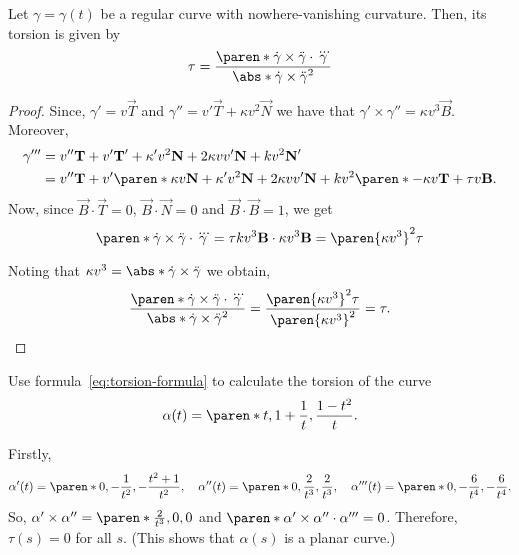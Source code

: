 \documentclass[11pt]{penrose}
\newcommand{\vT}{\vec{T}}
\newcommand{\vN}{\vec{N}}
\newcommand{\vB}{\vec{B}}
\begin{document}
\begin{nthm}
    Let $\gamma = \gamma(t)$ be a regular curve with nowhere-vanishing curvature. Then, its torsion is given by
    \begin{equation}
        \tau
        = \frac{\paren*{\dot{\gamma} \times \ddot{\gamma}} \cdot \dddot{\gamma}}{\abs*{\dot{\gamma} \times \ddot{\gamma}}^2}
        \label{eq:torsion-formula}
    \end{equation}
\end{nthm}
\begin{proof}
    Since, $\gamma' = v \vT$ and $\gamma'' = v' \vT + \kappa v^2 \vN$ we have that $\gamma' \times \gamma'' = \kappa v^3 \vB$. Moreover,
    \begin{align}
        \gamma'''
        &= v'' \vT + v' \vT' + \kappa' v^2 \vN + 2 \kappa v v' \vN + k v^2 \vN'\\
        &= v'' \vT + v' \paren*{\kappa v \vN} + \kappa' v^2 \vN + 2 \kappa v v' \vN + k v^2 \paren*{-\kappa v \vT + \tau v \vB}.
    \end{align}
    Now, since $\vB \cdot \vT = 0$, $\vB \cdot \vN = 0$ and $\vB \cdot \vB = 1$, we get
    \begin{equation}
        \paren*{\dot{\gamma} \times \ddot{\gamma}} \cdot \dddot{\gamma}
        = \tau k v^3 \vB \cdot \kappa v^3 \vB
        = \paren{\kappa v^3}^2 \tau
    \end{equation}

    Noting that $\kappa v^3 = \abs*{\dot{\gamma} \times \ddot{\gamma}}$ we obtain,
    \begin{equation}
        \frac{\paren*{\dot{\gamma} \times \ddot{\gamma}} \cdot \dddot{\gamma}}{\abs*{\dot{\gamma} \times \ddot{\gamma}}^2}
        = \frac{\paren{\kappa v^3}^2 \tau}{\paren{\kappa v^3}^2}
        = \tau.\qedhere
    \end{equation}
\end{proof}

\begin{negg}
    Use formula~\eqref{eq:torsion-formula} to calculate the torsion of the curve
    \begin{equation}
        \alpha(t)
        = \paren*{ t, 1 + \frac{1}{t}, \frac{1 - t^2}{t} }.
    \end{equation}

    Firstly,
    \begin{equation}
        \alpha'(t) = \paren*{0, -\frac{1}{t^2}, -\frac{t^2 + 1}{t^2}}, \quad
        \alpha''(t) = \paren*{0, \frac{2}{t^3}, \frac{2}{t^3}}, \quad
        \alpha'''(t) = \paren*{0, -\frac{6}{t^4}, -\frac{6}{t^4}}.
    \end{equation}
    So, $\alpha' \times \alpha'' = \paren*{\frac{2}{t^3}, 0, 0}$ and $\paren*{\alpha' \times \alpha''} \cdot \alpha''' = 0$. Therefore, $\tau(s) = 0$ for all $s$. (This shows that $\alpha(s)$ is a planar curve.)
\end{negg}
\end{document}
